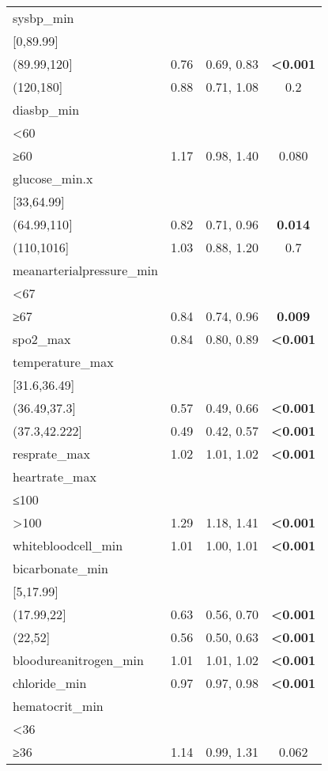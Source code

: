 \documentclass[
]{article}
\begin{document}
\begin{longtable}[]{@{}lccc@{}}
sysbp\_min & & & \\
{[}0,89.99{]} & & & \\
(89.99,120{]} & 0.76 & 0.69, 0.83 & \textbf{\textless0.001} \\
(120,180{]} & 0.88 & 0.71, 1.08 & 0.2 \\
diasbp\_min & & & \\
\textless60 & & & \\
≥60 & 1.17 & 0.98, 1.40 & 0.080 \\
glucose\_min.x & & & \\
{[}33,64.99{]} & & & \\
(64.99,110{]} & 0.82 & 0.71, 0.96 & \textbf{0.014} \\
(110,1016{]} & 1.03 & 0.88, 1.20 & 0.7 \\
meanarterialpressure\_min & & & \\
\textless67 & & & \\
≥67 & 0.84 & 0.74, 0.96 & \textbf{0.009} \\
spo2\_max & 0.84 & 0.80, 0.89 & \textbf{\textless0.001} \\
temperature\_max & & & \\
{[}31.6,36.49{]} & & & \\
(36.49,37.3{]} & 0.57 & 0.49, 0.66 & \textbf{\textless0.001} \\
(37.3,42.222{]} & 0.49 & 0.42, 0.57 & \textbf{\textless0.001} \\
resprate\_max & 1.02 & 1.01, 1.02 & \textbf{\textless0.001} \\
heartrate\_max & & & \\
≤100 & & & \\
\textgreater100 & 1.29 & 1.18, 1.41 & \textbf{\textless0.001} \\
whitebloodcell\_min & 1.01 & 1.00, 1.01 & \textbf{\textless0.001} \\
bicarbonate\_min & & & \\
{[}5,17.99{]} & & & \\
(17.99,22{]} & 0.63 & 0.56, 0.70 & \textbf{\textless0.001} \\
(22,52{]} & 0.56 & 0.50, 0.63 & \textbf{\textless0.001} \\
bloodureanitrogen\_min & 1.01 & 1.01, 1.02 & \textbf{\textless0.001} \\
chloride\_min & 0.97 & 0.97, 0.98 & \textbf{\textless0.001} \\
hematocrit\_min & & & \\
\textless36 & & & \\
≥36 & 1.14 & 0.99, 1.31 & 0.062 \\

\end{longtable}
\end{document}
